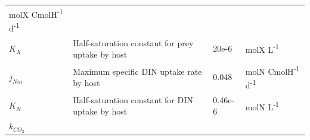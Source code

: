 \documentclass[]{elsarticle} %
\begin{document}
\begin{longtable}[c]{@{}llll@{}}
\begin{minipage}[t]{0.23\columnwidth}
molX CmolH\textsuperscript{-1} d\textsuperscript{-1}
\strut\end{minipage}\tabularnewline
\begin{minipage}[t]{0.10\columnwidth}\raggedright\strut
\(K_X\)
\strut\end{minipage} &
\begin{minipage}[t]{0.48\columnwidth}\raggedright\strut
Half-saturation constant for prey uptake by host
\strut\end{minipage} &
\begin{minipage}[t]{0.09\columnwidth}\raggedright\strut
20e-6
\strut\end{minipage} &
\begin{minipage}[t]{0.23\columnwidth}\raggedright\strut
molX L\textsuperscript{-1}
\strut\end{minipage}\tabularnewline
\begin{minipage}[t]{0.10\columnwidth}\raggedright\strut
\(j_{Nm}\)
\strut\end{minipage} &
\begin{minipage}[t]{0.48\columnwidth}\raggedright\strut
Maximum specific DIN uptake rate by host
\strut\end{minipage} &
\begin{minipage}[t]{0.09\columnwidth}\raggedright\strut
0.048
\strut\end{minipage} &
\begin{minipage}[t]{0.23\columnwidth}\raggedright\strut
molN CmolH\textsuperscript{-1} d\textsuperscript{-1}
\strut\end{minipage}\tabularnewline
\begin{minipage}[t]{0.10\columnwidth}\raggedright\strut
\(K_N\)
\strut\end{minipage} &
\begin{minipage}[t]{0.48\columnwidth}\raggedright\strut
Half-saturation constant for DIN uptake by host
\strut\end{minipage} &
\begin{minipage}[t]{0.09\columnwidth}\raggedright\strut
0.46e-6
\strut\end{minipage} &
\begin{minipage}[t]{0.23\columnwidth}\raggedright\strut
molN L\textsuperscript{-1}
\strut\end{minipage}\tabularnewline
\begin{minipage}[t]{0.10\columnwidth}\raggedright\strut
\(k_{CO_2}\)
\strut\end{minipage} &
\begin{minipage}[t]{0.48\columnwidth}\raggedright\strut

\end{minipage}
\end{longtable}
\end{document}
